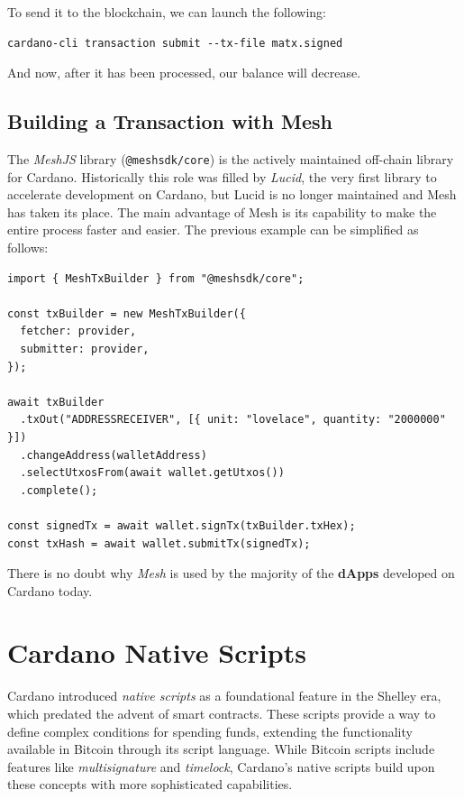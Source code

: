 To send it to the blockchain, we can launch the following:

\begin{lstlisting}
cardano-cli transaction submit --tx-file matx.signed
\end{lstlisting}

And now, after it has been processed, our balance will decrease.

\subsection{Building a Transaction with Mesh}

The \textit{MeshJS} library (\texttt{@meshsdk/core}) is the actively maintained off-chain library for Cardano. Historically this role was filled by \textit{Lucid}, the very first library to accelerate development on Cardano, but Lucid is no longer maintained and Mesh has taken its place. The main advantage of Mesh is its capability to make the entire process faster and easier. The previous example can be simplified as follows:

\begin{lstlisting}
import { MeshTxBuilder } from "@meshsdk/core";

const txBuilder = new MeshTxBuilder({
  fetcher: provider,
  submitter: provider,
});

await txBuilder
  .txOut("ADDRESSRECEIVER", [{ unit: "lovelace", quantity: "2000000" }])
  .changeAddress(walletAddress)
  .selectUtxosFrom(await wallet.getUtxos())
  .complete();

const signedTx = await wallet.signTx(txBuilder.txHex);
const txHash = await wallet.submitTx(signedTx);
\end{lstlisting}

There is no doubt why \textit{Mesh} is used by the majority of the \textbf{dApps} developed on Cardano today.

\section{Cardano Native Scripts}

Cardano introduced \textit{native scripts} as a foundational feature in the Shelley era, which predated the advent of smart contracts. These scripts provide a way to define complex conditions for spending funds, extending the functionality available in Bitcoin through its script language. While Bitcoin scripts include features like \textit{multisignature} and \textit{timelock}, Cardano's native scripts build upon these concepts with more sophisticated capabilities.

